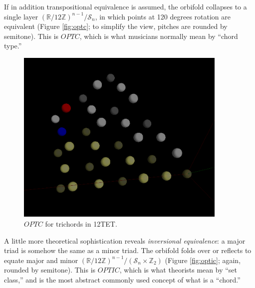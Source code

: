 \documentclass[english,11pt,letterpaper,onecolumn]{scrartcl}
\numberwithin{equation}{section}
\begin{document}
    If in addition transpositional equivalence is assumed, the orbifold 
collapses 
    to a single layer 
$\left(\mathbb{R}/12\mathbb{Z}\right)^{n-1}/\mathcal{S}_{n}$, 
    in which points at 120 degrees rotation are equivalent (Figure 
\ref{fig:optc}; 
    to simplify the view, pitches are rounded by semitone). This is $OPTC$, 
which 
    is what musicians normally mean by ``chord type.''
    
    \begin{figure}
        \centerline{\includegraphics[width = 0.9\textwidth]{opttc}}
        \caption{\label{fig:opttc} 
            $OPTC$ for trichords in 12TET.}
    \end{figure}
    
    A little more theoretical sophistication reveals \textit{inversional 
        equivalence}: a major triad is somehow the same as a minor triad. The 
    orbifold folds over or reflects to equate major and minor 
    $\left(\mathbb{R}/12\mathbb{Z}\right)^{n-1}/(\mathcal{S}_{n} \times 
    \mathbb{Z}_{2})$ (Figure \ref{fig:optic}; again, rounded by semitone). This 
is 
    $OPTIC$, which is what theorists mean by ``set class,'' and is the most 
    abstract commonly used concept of what is a ``chord.''
    
\end{document}
